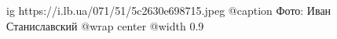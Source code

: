  
 
 
 
 

\ifcmt
  ig https://i.lb.ua/071/51/5c2630e698715.jpeg
	@caption Фото: Иван Станиславский
  @wrap center
  @width 0.9
\fi

